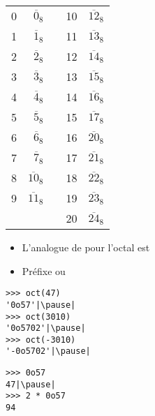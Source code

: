 \begin{frame}

  \bigskip
  
  \begin{center}
    \begin{tabular}[ht]{rrp{2cm}rr}
      0 & $\overline{0}_{8}$ & &10 & $\overline{12}_{8}$\\
      1 & $\overline{1}_{8}$ & &11 & $\overline{13}_{8}$\\
      2 & $\overline{2}_{8}$ & &12 & $\overline{14}_{8}$\\
      3 & $\overline{3}_{8}$ & &13 & $\overline{15}_{8}$\\
      4 & $\overline{4}_{8}$ & &14 & $\overline{16}_{8}$\\
      5 & $\overline{5}_{8}$ & &15 & $\overline{17}_{8}$\\
      6 & $\overline{6}_{8}$ & &16 & $\overline{20}_{8}$\\
      7 & $\overline{7}_{8}$ & &17 & $\overline{21}_{8}$\\
      8 & $\overline{10}_{8}$ & &18 & $\overline{22}_{8}$\\
      9 & $\overline{11}_{8}$ & &19 & $\overline{23}_{8}$\\
      &  & &20 & $\overline{24}_{8}$\\
    \end{tabular}
  \end{center}
\end{frame}

\begin{frame}[fragile]


\begin{itemize}
  \pause
  \item L'analogue de  pour l'octal est 
  \pause
  \item Préfixe  ou 
\end{itemize}
  \pause
  
\begin{lstlisting}
>>> oct(47)
'0o57'|\pause|
>>> oct(3010)
'0o5702'|\pause|
>>> oct(-3010)
'-0o5702'|\pause|
\end{lstlisting}

\begin{lstlisting}
>>> 0o57
47|\pause|
>>> 2 * 0o57 
94
\end{lstlisting}
\end{frame}

